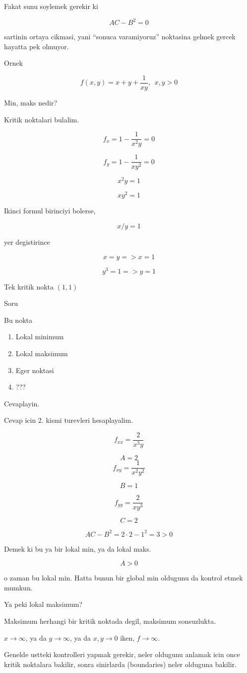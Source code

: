 \documentclass[12pt,fleqn]{article}\usepackage{../common}
\begin{document}
Fakat sunu soylemek gerekir ki 

\[ AC - B^2 = 0 \]

sartinin ortaya cikmasi, yani ``sonuca varamiyoruz'' noktasina gelmek
gercek hayatta pek olmuyor. 

Ornek

\[ f(x,y)= x + y + \frac{1}{xy}, \ \ x,y > 0 \]

Min, maks nedir? 

Kritik noktalari bulalim. 

\[ f_x = 1 - \frac{1}{x^2y} = 0\]

\[ f_y = 1 - \frac{1}{xy^2} = 0\]

\[ x^2y = 1 \]

\[ xy^2 = 1 \]

Ikinci formul birinciyi bolerse, 

\[ x/y = 1 \]

yer degistirince

\[ x = y => x = 1 \]

\[ y^3 = 1 => y = 1 \]

Tek kritik nokta $(1,1)$

Soru

Bu nokta 

\begin{enumerate}
   \item Lokal minimum
   \item Lokal maksimum
   \item Eger noktasi
   \item ???
\end{enumerate}

Cevaplayin. 

Cevap icin 2. kismi turevleri hesaplayalim. 

\[ f_{xx} = \frac{2}{x^3y} \]

\[  A = 2 \]
\[ f_{xy} = \frac{1}{x^2y^2} \]

\[ B = 1 \]

\[ f_{yy} = \frac{2}{xy^3} \]

\[ C = 2 \]

\[ AC - B^2 = 2 \cdot 2 - 1^2 = 3 > 0 \]

Demek ki bu ya bir lokal min, ya da lokal maks. 

\[ A > 0 \]

o zaman bu lokal min. Hatta bunun bir global min oldugunu da kontrol etmek
mumkun. 

Ya peki lokal maksimum? 

Maksimum herhangi bir kritik noktada degil, maksimum sonsuzlukta. 

$x \to \infty$, ya da $y \to \infty$, ya da $x,y \to 0$ iken, $f \to
\infty$. 

Genelde ustteki kontrolleri yapmak gerekir, neler oldugunu anlamak icin
once kritik noktalara bakilir, sonra sinirlarda (boundaries) neler olduguna
bakilir.
\end{document}
